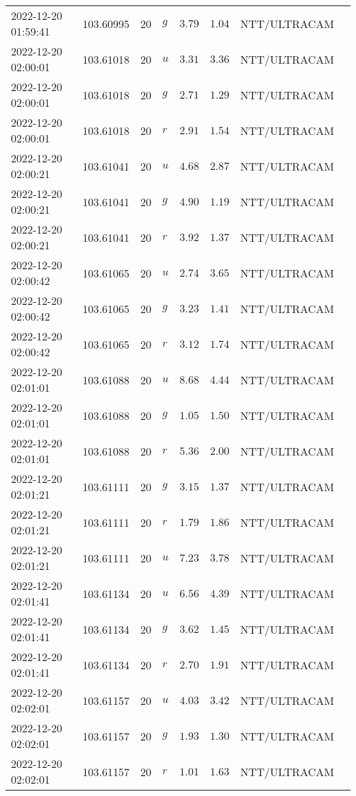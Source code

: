 \documentclass{nature_plusfigure}
\begin{document}
\begin{supplement}
\begin{center}
\begin{longtable}{llllllll}
2022-12-20 01:59:41 & 103.60995 & 20 & $g$ & $3.79$ & $1.04$ & NTT/ULTRACAM &  \\ 
2022-12-20 02:00:01 & 103.61018 & 20 & $u$ & $3.31$ & $3.36$ & NTT/ULTRACAM &  \\ 
2022-12-20 02:00:01 & 103.61018 & 20 & $g$ & $2.71$ & $1.29$ & NTT/ULTRACAM &  \\ 
2022-12-20 02:00:01 & 103.61018 & 20 & $r$ & $2.91$ & $1.54$ & NTT/ULTRACAM &  \\ 
2022-12-20 02:00:21 & 103.61041 & 20 & $u$ & $4.68$ & $2.87$ & NTT/ULTRACAM &  \\ 
2022-12-20 02:00:21 & 103.61041 & 20 & $g$ & $4.90$ & $1.19$ & NTT/ULTRACAM &  \\ 
2022-12-20 02:00:21 & 103.61041 & 20 & $r$ & $3.92$ & $1.37$ & NTT/ULTRACAM &  \\ 
2022-12-20 02:00:42 & 103.61065 & 20 & $u$ & $2.74$ & $3.65$ & NTT/ULTRACAM &  \\ 
2022-12-20 02:00:42 & 103.61065 & 20 & $g$ & $3.23$ & $1.41$ & NTT/ULTRACAM &  \\ 
2022-12-20 02:00:42 & 103.61065 & 20 & $r$ & $3.12$ & $1.74$ & NTT/ULTRACAM &  \\ 
2022-12-20 02:01:01 & 103.61088 & 20 & $u$ & $8.68$ & $4.44$ & NTT/ULTRACAM &  \\ 
2022-12-20 02:01:01 & 103.61088 & 20 & $g$ & $1.05$ & $1.50$ & NTT/ULTRACAM &  \\ 
2022-12-20 02:01:01 & 103.61088 & 20 & $r$ & $5.36$ & $2.00$ & NTT/ULTRACAM &  \\ 
2022-12-20 02:01:21 & 103.61111 & 20 & $g$ & $3.15$ & $1.37$ & NTT/ULTRACAM &  \\ 
2022-12-20 02:01:21 & 103.61111 & 20 & $r$ & $1.79$ & $1.86$ & NTT/ULTRACAM &  \\ 
2022-12-20 02:01:21 & 103.61111 & 20 & $u$ & $7.23$ & $3.78$ & NTT/ULTRACAM &  \\ 
2022-12-20 02:01:41 & 103.61134 & 20 & $u$ & $6.56$ & $4.39$ & NTT/ULTRACAM &  \\ 
2022-12-20 02:01:41 & 103.61134 & 20 & $g$ & $3.62$ & $1.45$ & NTT/ULTRACAM &  \\ 
2022-12-20 02:01:41 & 103.61134 & 20 & $r$ & $2.70$ & $1.91$ & NTT/ULTRACAM &  \\ 
2022-12-20 02:02:01 & 103.61157 & 20 & $u$ & $4.03$ & $3.42$ & NTT/ULTRACAM &  \\ 
2022-12-20 02:02:01 & 103.61157 & 20 & $g$ & $1.93$ & $1.30$ & NTT/ULTRACAM &  \\ 
2022-12-20 02:02:01 & 103.61157 & 20 & $r$ & $1.01$ & $1.63$ & NTT/ULTRACAM &  \\ 

\end{longtable}
\end{center}
\end{supplement}
\end{document}
